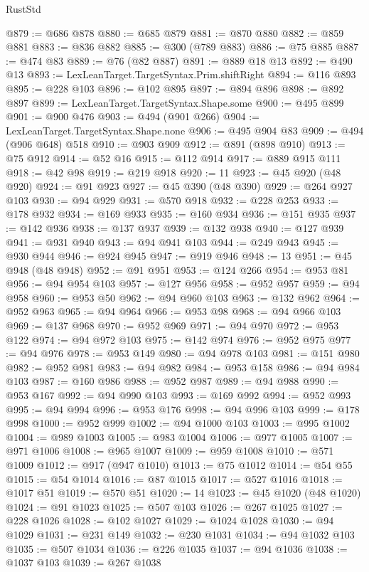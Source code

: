 \begin{lexlean}{RustStd}
\begin{coremodule}
{\begin{coremodule}
{{{{{{{{{{{{{{{{{{{{{{{{{{{{{{{{{{{{{@879 := @686 @878
@880 := @685 @879
@881 := @870 @880
@882 := @859 @881
@883 := @836 @882
@885 := @300 (@789 @883)
@886 := @75 @885
@887 := @474 @83
@889 := @76 (@82 @887)
@891 := @889 @18 @13
@892 := @490 @13
@893 := LexLeanTarget.TargetSyntax.Prim.shiftRight
@894 := @116 @893
@895 := @228 @103
@896 := @102 @895
@897 := @894 @896
@898 := @892 @897
@899 := LexLeanTarget.TargetSyntax.Shape.some
@900 := @495 @899
@901 := @900 @476
@903 := @494 (@901 @266)
@904 := LexLeanTarget.TargetSyntax.Shape.none
@906 := @495 @904 @83
@909 := @494 (@906 @648) @518
@910 := @903 @909
@912 := @891 (@898 @910)
@913 := @75 @912
@914 := @52 @16
@915 := @112 @914
@917 := @889 @915 @111
@918 := @42 @98
@919 := @219 @918
@920 := 11
@923 := @45 @920 (@48 @920)
@924 := @91 @923
@927 := @45 @390 (@48 @390)
@929 := @264 @927 @103
@930 := @94 @929
@931 := @570 @918
@932 := @228 @253
@933 := @178 @932
@934 := @169 @933
@935 := @160 @934
@936 := @151 @935
@937 := @142 @936
@938 := @137 @937
@939 := @132 @938
@940 := @127 @939
@941 := @931 @940
@943 := @94 @941 @103
@944 := @249 @943
@945 := @930 @944
@946 := @924 @945
@947 := @919 @946
@948 := 13
@951 := @45 @948 (@48 @948)
@952 := @91 @951
@953 := @124 @266
@954 := @953 @81
@956 := @94 @954 @103
@957 := @127 @956
@958 := @952 @957
@959 := @94 @958
@960 := @953 @50
@962 := @94 @960 @103
@963 := @132 @962
@964 := @952 @963
@965 := @94 @964
@966 := @953 @98
@968 := @94 @966 @103
@969 := @137 @968
@970 := @952 @969
@971 := @94 @970
@972 := @953 @122
@974 := @94 @972 @103
@975 := @142 @974
@976 := @952 @975
@977 := @94 @976
@978 := @953 @149
@980 := @94 @978 @103
@981 := @151 @980
@982 := @952 @981
@983 := @94 @982
@984 := @953 @158
@986 := @94 @984 @103
@987 := @160 @986
@988 := @952 @987
@989 := @94 @988
@990 := @953 @167
@992 := @94 @990 @103
@993 := @169 @992
@994 := @952 @993
@995 := @94 @994
@996 := @953 @176
@998 := @94 @996 @103
@999 := @178 @998
@1000 := @952 @999
@1002 := @94 @1000 @103
@1003 := @995 @1002
@1004 := @989 @1003
@1005 := @983 @1004
@1006 := @977 @1005
@1007 := @971 @1006
@1008 := @965 @1007
@1009 := @959 @1008
@1010 := @571 @1009
@1012 := @917 (@947 @1010)
@1013 := @75 @1012
@1014 := @54 @55
@1015 := @54 @1014
@1016 := @87 @1015
@1017 := @527 @1016
@1018 := @1017 @51
@1019 := @570 @51
@1020 := 14
@1023 := @45 @1020 (@48 @1020)
@1024 := @91 @1023
@1025 := @507 @103
@1026 := @267 @1025
@1027 := @228 @1026
@1028 := @102 @1027
@1029 := @1024 @1028
@1030 := @94 @1029
@1031 := @231 @149
@1032 := @230 @1031
@1034 := @94 @1032 @103
@1035 := @507 @1034
@1036 := @226 @1035
@1037 := @94 @1036
@1038 := @1037 @103
@1039 := @267 @1038
}}}}}}}}}}}}}}}}}}}}}}}}}}}}}}}}}}}}}
\end{coremodule}}
\end{coremodule}
\end{lexlean}
